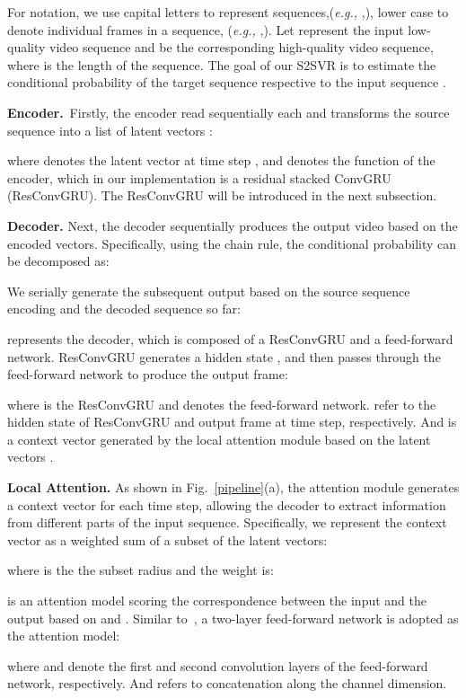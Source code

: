 \documentclass[nohyperref]{article}
\newcommand{\eg}{\emph{e.g., }}
\theoremstyle{plain}
\theoremstyle{definition}
\theoremstyle{remark}
\begin{document}
For notation, we use capital letters to represent sequences,(\eg ,), lower case to denote individual frames in a sequence, (\eg ,). Let  represent the input low-quality video sequence and  be the corresponding high-quality video sequence, where  is the length of the sequence. The goal of our S2SVR is to estimate the conditional probability of the target sequence respective to the input sequence .

\textbf{Encoder.}~Firstly, the encoder read sequentially each  and transforms the source sequence into a list of latent vectors :

where  denotes the latent vector at time step , and  denotes the function of the encoder, which in our implementation is a residual stacked ConvGRU (ResConvGRU). The ResConvGRU will be introduced in the next subsection.

\textbf{Decoder.} Next, the decoder sequentially produces the output video based on the encoded vectors. Specifically, using the chain rule, the conditional probability   can be decomposed as:

We serially generate the subsequent output based on the source sequence encoding and the decoded sequence so far:

 represents the decoder, which is composed of a ResConvGRU and a feed-forward network. ResConvGRU generates a hidden state , and then  passes through the feed-forward network to produce the output frame:

where  is the ResConvGRU and  denotes the feed-forward network.  refer to the hidden state of ResConvGRU and output frame at  time step, respectively.  And  is a context vector generated by the local attention module based on the latent vectors .

\textbf{Local Attention.} As shown in Fig.{~\ref{pipeline}(a)}, the attention module generates a context vector  for each time step, allowing the decoder to extract information from different parts of the input sequence. Specifically, we represent the context vector  as a weighted sum of a subset of the latent vectors:

where  is the the subset radius and the weight  is:

 is an attention model scoring the correspondence between the  input and the  output based on  and . Similar to~\cite{r35}, a two-layer feed-forward network is adopted as the attention model:

where  and  denote the first and second convolution layers of the feed-forward network, respectively. And  refers to concatenation along the channel dimension. 
\end{document}
